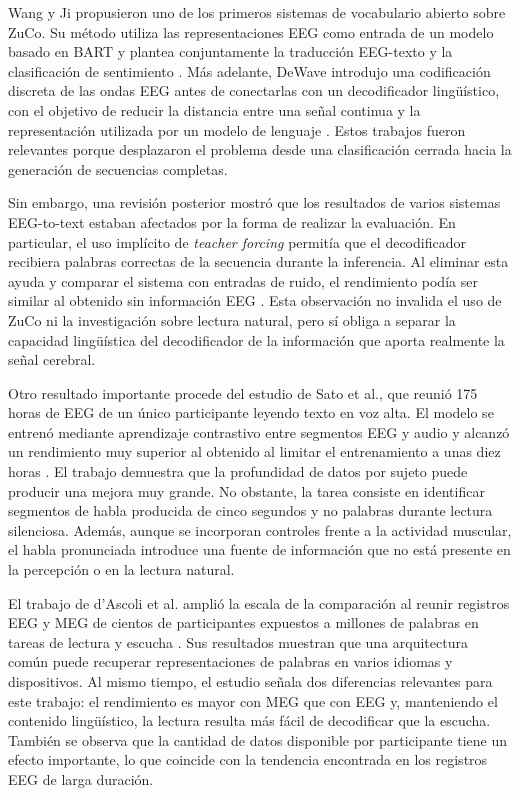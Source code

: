 Wang y Ji propusieron uno de los primeros sistemas de vocabulario abierto sobre ZuCo. Su método utiliza las representaciones EEG como entrada de un modelo basado en BART y plantea conjuntamente la traducción EEG-texto y la clasificación de sentimiento \cite{wang2022openvocab}. Más adelante, DeWave introdujo una codificación discreta de las ondas EEG antes de conectarlas con un decodificador lingüístico, con el objetivo de reducir la distancia entre una señal continua y la representación utilizada por un modelo de lenguaje \cite{duan2023dewave}. Estos trabajos fueron relevantes porque desplazaron el problema desde una clasificación cerrada hacia la generación de secuencias completas.

Sin embargo, una revisión posterior mostró que los resultados de varios sistemas EEG-to-text estaban afectados por la forma de realizar la evaluación. En particular, el uso implícito de \textit{teacher forcing} permitía que el decodificador recibiera palabras correctas de la secuencia durante la inferencia. Al eliminar esta ayuda y comparar el sistema con entradas de ruido, el rendimiento podía ser similar al obtenido sin información EEG \cite{jo2024eegtext}. Esta observación no invalida el uso de ZuCo ni la investigación sobre lectura natural, pero sí obliga a separar la capacidad lingüística del decodificador de la información que aporta realmente la señal cerebral.

Otro resultado importante procede del estudio de Sato et al., que reunió 175 horas de EEG de un único participante leyendo texto en voz alta. El modelo se entrenó mediante aprendizaje contrastivo entre segmentos EEG y audio y alcanzó un rendimiento muy superior al obtenido al limitar el entrenamiento a unas diez horas \cite{sato2024scaling}. El trabajo demuestra que la profundidad de datos por sujeto puede producir una mejora muy grande. No obstante, la tarea consiste en identificar segmentos de habla producida de cinco segundos y no palabras durante lectura silenciosa. Además, aunque se incorporan controles frente a la actividad muscular, el habla pronunciada introduce una fuente de información que no está presente en la percepción o en la lectura natural.

El trabajo de d'Ascoli et al. amplió la escala de la comparación al reunir registros EEG y MEG de cientos de participantes expuestos a millones de palabras en tareas de lectura y escucha \cite{dascoli2024words}. Sus resultados muestran que una arquitectura común puede recuperar representaciones de palabras en varios idiomas y dispositivos. Al mismo tiempo, el estudio señala dos diferencias relevantes para este trabajo: el rendimiento es mayor con MEG que con EEG y, manteniendo el contenido lingüístico, la lectura resulta más fácil de decodificar que la escucha. También se observa que la cantidad de datos disponible por participante tiene un efecto importante, lo que coincide con la tendencia encontrada en los registros EEG de larga duración.

